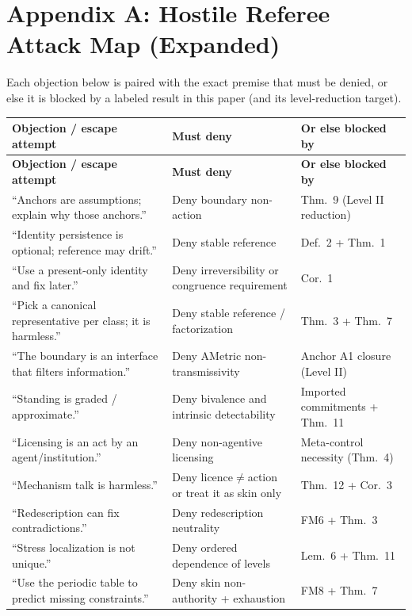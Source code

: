 \documentclass[12pt]{article}
\theoremstyle{plain}
\begin{document}
\appendix

\section{Appendix A: Hostile Referee Attack Map (Expanded)}

Each objection below is paired with the exact premise that must be denied, or else it is blocked by a labeled result in this paper (and its level-reduction target).

\renewcommand{\arraystretch}{1.15}
\begin{longtable}{@{}p{}p{}p{}@{}}
\toprule
\textbf{Objection / escape attempt} & \textbf{Must deny} & \textbf{Or else blocked by}\\
\midrule
\endfirsthead
\toprule
\textbf{Objection / escape attempt} & \textbf{Must deny} & \textbf{Or else blocked by}\\
\midrule
\endhead
``Anchors are assumptions; explain why those anchors.'' & Deny boundary non-action & Thm.\ 9 (Level II reduction)\\
``Identity persistence is optional; reference may drift.'' & Deny stable reference & Def.\ 2 + Thm.\ 1\\
``Use a present-only identity and fix later.'' & Deny irreversibility or congruence requirement & Cor.\ 1\\
``Pick a canonical representative per class; it is harmless.'' & Deny stable reference / factorization & Thm.\ 3 + Thm.\ 7\\
``The boundary is an interface that filters information.'' & Deny AMetric non-transmissivity & Anchor A1 closure (Level II)\\
``Standing is graded / approximate.'' & Deny bivalence and intrinsic detectability & Imported commitments + Thm.\ 11\\
``Licensing is an act by an agent/institution.'' & Deny non-agentive licensing & Meta-control necessity (Thm.\ 4)\\
``Mechanism talk is harmless.'' & Deny licence$\neq$action or treat it as skin only & Thm.\ 12 + Cor.\ 3\\
``Redescription can fix contradictions.'' & Deny redescription neutrality & FM6 + Thm.\ 3\\
``Stress localization is not unique.'' & Deny ordered dependence of levels & Lem.\ 6 + Thm.\ 11\\
``Use the periodic table to predict missing constraints.'' & Deny skin non-authority + exhaustion & FM8 + Thm.\ 7\\

\end{longtable}
\end{document}
